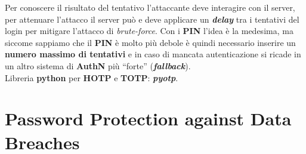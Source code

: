 \begin{flushleft}
    Per conoscere il risultato del tentativo l'attaccante deve interagire con il server, per attenuare l'attacco il server può e deve applicare un \textbf{\textit{delay}} tra i tentativi del login per mitigare l'attacco di \textit{brute-force}. Con i \textbf{PIN} l'idea è la medesima, ma siccome sappiamo che il \textbf{PIN} è molto più debole è quindi necessario inserire un \textbf{numero massimo di tentativi} e in caso di mancata autenticazione si ricade in un altro sistema di \textbf{AuthN} più ``forte'' (\textbf{\textit{fallback}}). \\

    Libreria \textbf{python} per \textbf{HOTP} e \textbf{TOTP}: \textbf{\textit{pyotp}}.

\end{flushleft}

\section{Password Protection against Data Breaches}